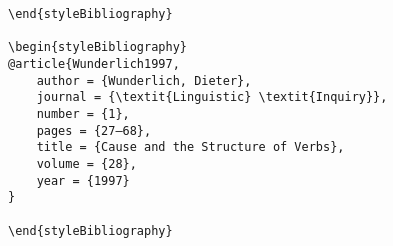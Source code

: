 \documentclass[output=paper]{langscibook}
\begin{document}
\begin{verbatim}
\end{styleBibliography}

\begin{styleBibliography}
@article{Wunderlich1997,
	author = {Wunderlich, Dieter},
	journal = {\textit{Linguistic} \textit{Inquiry}},
	number = {1},
	pages = {27–68},
	title = {Cause and the Structure of Verbs},
	volume = {28},
	year = {1997}
}

\end{styleBibliography}

\end{verbatim}
\sloppy\printbibliography[heading=subbibliography,notkeyword=this]
\end{document}
